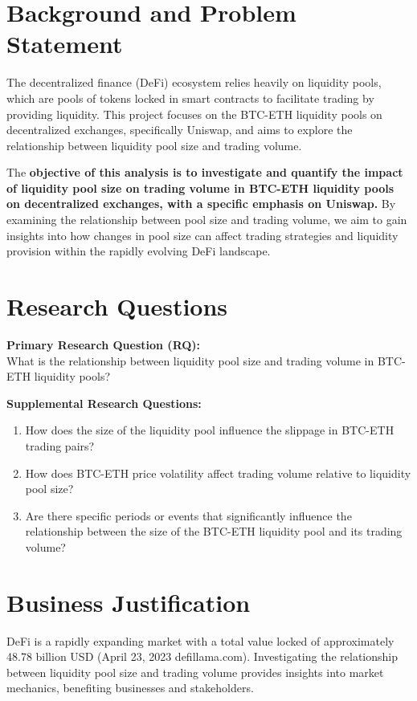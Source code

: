 \documentclass{article}
\begin{document}
{\section*{\textbf{Background and Problem Statement}}

The decentralized finance (DeFi) ecosystem relies heavily on liquidity pools, which are pools of tokens locked in smart contracts to facilitate trading by providing liquidity. This project focuses on the BTC-ETH liquidity pools on decentralized exchanges, specifically Uniswap, and aims to explore the relationship between liquidity pool size and trading volume.

The \textbf{objective of this analysis is to investigate and quantify the impact of liquidity pool size on trading volume in BTC-ETH liquidity pools on decentralized exchanges, with a specific emphasis on Uniswap.} By examining the relationship between pool size and trading volume, we aim to gain insights into how changes in pool size can affect trading strategies and liquidity provision within the rapidly evolving DeFi landscape.

\section*{Research Questions}

\textbf{Primary Research Question (RQ):} \\ What is the relationship between liquidity pool size and trading volume in BTC-ETH liquidity pools?

\textbf{Supplemental Research Questions:}
\begin{enumerate}[itemsep=0pt, topsep=0pt]
\item How does the size of the liquidity pool influence the slippage in BTC-ETH trading pairs?
\item How does BTC-ETH price volatility affect trading volume relative to liquidity pool size?
\item Are there specific periods or events that significantly influence the relationship between the size of the BTC-ETH liquidity pool and its trading volume?
\end{enumerate}

\section*{Business Justification}

DeFi is a rapidly expanding market with a total value locked of approximately 48.78 billion USD (April 23, 2023 defillama.com). Investigating the relationship between liquidity pool size and trading volume provides insights into market mechanics, benefiting businesses and stakeholders.

}
\end{document}
